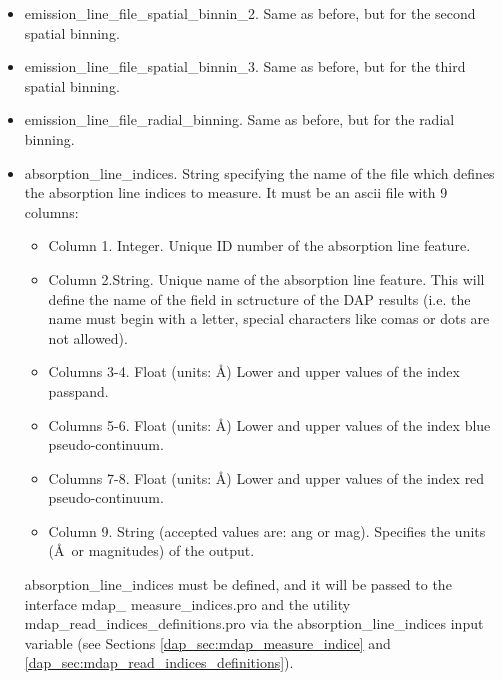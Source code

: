\begin{itemize}
 \item emission\_line\_file\_spatial\_binnin\_2. Same as before, but
   for the second spatial binning.

 \item emission\_line\_file\_spatial\_binnin\_3. Same as before, but
   for the third spatial binning.
    
 \item emission\_line\_file\_radial\_binning. Same as before, but for
   the radial binning.

 \item absorption\_line\_indices. String specifying the name of the
   file which defines the absorption line indices to measure. It must
   be an ascii file with 9 columns:

   \begin{itemize}

     \item Column 1. Integer. Unique ID number of the absorption line
       feature.

     \item Column 2.String. Unique name of the absorption line
       feature. This will define the name of the field in sctructure
       of the DAP results (i.e. the name must begin with a letter,
       special characters like comas or dots are not allowed).

     \item Columns 3-4. Float (units: \AA) Lower and upper values of
       the index passpand.

     \item Columns 5-6.  Float (units: \AA) Lower and upper values of
       the index blue pseudo-continuum.

     \item Columns 7-8.  Float (units: \AA) Lower and upper values of
       the index red pseudo-continuum.

     \item Column 9. String (accepted values are: ang or
       mag). Specifies the units (\AA\ or magnitudes) of the output.
 
    \end{itemize}
      
   absorption\_line\_indices must be defined, and it will be passed to
   the interface mdap\_ measure\_indices.pro and the utility
   mdap\_read\_indices\_definitions.pro via the
   absorption\_line\_indices input variable (see Sections
   \ref{dap_sec:mdap_measure_indice} and
   \ref{dap_sec:mdap_read_indices_definitions}).


\end{itemize}
